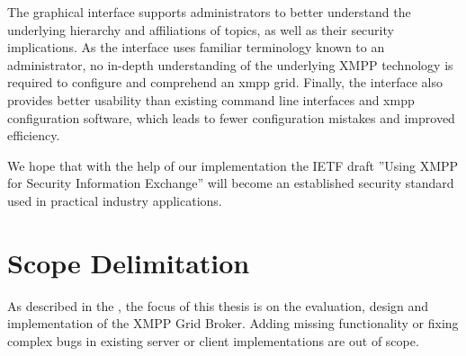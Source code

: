 The graphical interface supports administrators to better understand the underlying hierarchy and affiliations of \glspl{topic}, as well as their security implications.
As the interface uses familiar terminology known to an administrator, no in-depth understanding of the underlying XMPP technology is required to configure and comprehend an \gls{xmpp} grid.
Finally, the interface also provides better usability than existing command line interfaces and \gls{xmpp} configuration software, which leads to fewer configuration mistakes and improved efficiency.

We hope that with the help of our implementation the IETF draft ''Using XMPP for Security Information Exchange'' will become an established security standard used in practical industry applications.

\section{Scope Delimitation} %
As described in the , the focus of this thesis is on the evaluation, design and implementation of the XMPP Grid Broker.
Adding missing functionality or fixing complex bugs in existing server or client implementations are out of scope.
